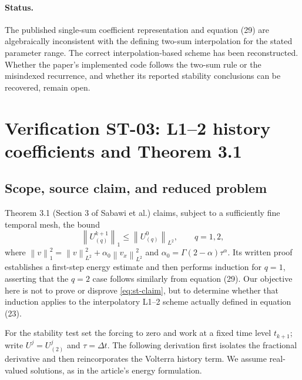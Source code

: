 \documentclass[11pt]{amsart}
\numberwithin{equation}{section}
\theoremstyle{remark}
\newcommand{\norm}[1]{\left\lVert #1\right\rVert}
\begin{document}
\paragraph{Status.}
The published single-sum coefficient representation and equation (29) are
algebraically inconsistent with the defining two-sum interpolation for the
stated parameter range. The correct interpolation-based scheme has been
reconstructed. Whether the paper's implemented code follows the two-sum rule
or the misindexed recurrence, and whether its reported stability conclusions
can be recovered, remain open.

\section{Verification ST-03: L1--2 history coefficients and Theorem 3.1}\label{sec:st}
\subsection{Scope, source claim, and reduced problem}
Theorem 3.1 (Section 3 of Sabawi et al.) claims, subject to a sufficiently
fine temporal mesh, the bound
\begin{equation}\label{eq:st-claim}
\norm{U_{(q)}^{k+1}}_1\leq\norm{U_{(q)}^0}_{L^2},\qquad q=1,2,
\end{equation}
where $\norm{v}_1^2=\norm{v}_{L^2}^2+\alpha_0\norm{v_x}_{L^2}^2$ and
$\alpha_0=\Gamma(2-\alpha)\tau^\alpha$. Its written proof establishes a
first-step energy estimate and then performs induction for $q=1$, asserting
that the $q=2$ case follows similarly from equation (29). Our objective here
is not to prove or disprove \eqref{eq:st-claim}, but to determine whether
that induction applies to the interpolatory L1--2 scheme actually defined
in equation (23).

For the stability test set the forcing to zero and work at a fixed time
level $t_{k+1}$; write $U^j=U_{(2)}^j$ and $\tau=\Delta t$. The following
derivation first isolates the fractional derivative and then reincorporates
the Volterra history term. We assume real-valued solutions, as in the
article's energy formulation.
\end{document}
